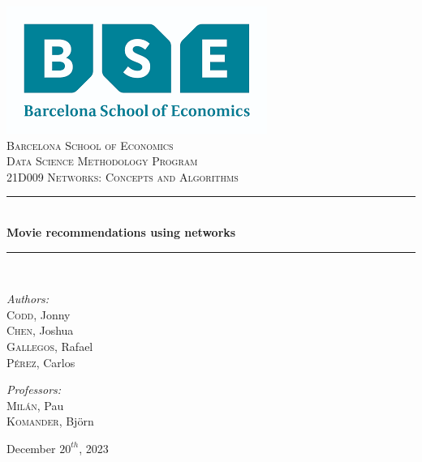\documentclass[12pt]{article}
\date{\today}							%
\numberwithin{equation}{section}
\begin{document}
\begin{titlepage}
	\centering
    \includegraphics[scale = 0.7]{bse_logo.png}\\[1.2 cm]	%
    \textsc{\LARGE Barcelona School of Economics}\\[2.0 cm]	%
	\textsc{\Large Data Science Methodology Program}\\[0.5 cm]				%
	\textsc{\large 21D009 Networks: Concepts and Algorithms }\\[0.5 cm]				%
	\rule{\linewidth}{0.2 mm} \\[0.4 cm]
	{ \huge \bfseries Movie recommendations using networks }\\
	\rule{ \linewidth}{0.2 mm} \\[1.5 cm]
	
\begin{center}
    
{ \emph{Authors: }\\
    \textsc{Codd}, Jonny \\
    \textsc{Chen}, Joshua \\
    \textsc{Gallegos}, Rafael \\
    \textsc{Pérez}, Carlos \\ } 

\vspace{0.7cm}


    \textit{Professors:}\\  \textsc{Milán}, Pau \\
    	\textsc{Komander}, Björn
        \\ \vspace{0.5cm}


\vspace{1.7cm}


{\large December $20^{th}$, 2023} \\[2 cm]

 \end{center}
	\vfill
	
\end{titlepage}
	
\tableofcontents
\vspace{1cm}
\listoffigures
\listoftables
\pagebreak
\end{document}
